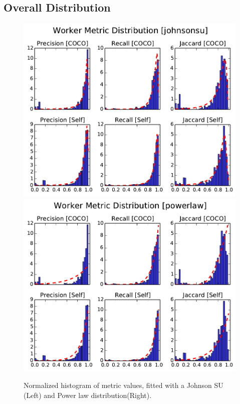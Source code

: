\documentclass[12pt]{article}
\begin{document}
\subsection{Overall Distribution}
\begin{figure}[ht]
\centering
\includegraphics[width=0.45\linewidth]{plots/johnsonsu_fitted_metric_histogram.pdf}
\includegraphics[width=0.45\linewidth]{plots/powerlaw_fitted_metric_histogram.pdf}
\caption{Normalized histogram of metric values, fitted with a Johnson SU (Left) and Power law distribution(Right). }
\label{metric_hist}
\end{figure}
\end{document}
